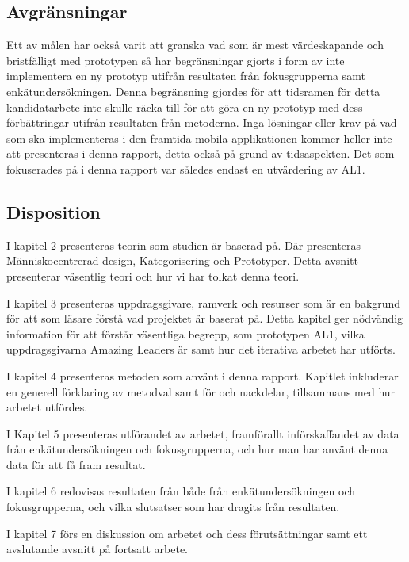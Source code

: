 \subsection{Avgränsningar}

Ett av målen har också varit  att granska vad som är mest värdeskapande och bristfälligt med prototypen så har begränsningar gjorts i form av inte implementera en ny prototyp utifrån resultaten från fokusgrupperna samt enkätundersökningen. Denna begränsning gjordes för att tidsramen för detta kandidatarbete inte skulle räcka till för att göra en ny prototyp med dess förbättringar utifrån resultaten från metoderna. Inga lösningar eller krav på vad som ska implementeras i den framtida mobila applikationen kommer heller inte att presenteras i denna rapport, detta också på grund av tidsaspekten. Det som fokuserades på i denna rapport var således endast en utvärdering av AL1.


\subsection{Disposition}
I kapitel 2 presenteras teorin som studien är baserad på. Där presenteras Människocentrerad design, Kategorisering och Prototyper. Detta avsnitt presenterar väsentlig teori och hur vi har tolkat denna teori. 
\newline

I kapitel 3 presenteras uppdragsgivare, ramverk och resurser som är en bakgrund för att som läsare förstå vad projektet är baserat på. Detta kapitel ger nödvändig information för att förstår väsentliga begrepp, som prototypen AL1, vilka uppdragsgivarna Amazing Leaders är samt hur det iterativa arbetet har utförts. 
\newline

I kapitel 4 presenteras metoden som använt i denna rapport. Kapitlet inkluderar en generell förklaring av metodval samt för och nackdelar, tillsammans med hur arbetet utfördes. 
\newline

I Kapitel 5 presenteras utförandet av arbetet, framförallt införskaffandet av data från enkätundersökningen och fokusgrupperna, och hur man har använt denna data för att få fram resultat.
\newline

I kapitel 6 redovisas resultaten från både från  enkätundersökningen och fokusgrupperna, och vilka slutsatser som har dragits från resultaten. 

I kapitel 7 förs en diskussion om arbetet och dess förutsättningar samt ett avslutande avsnitt på fortsatt arbete.
